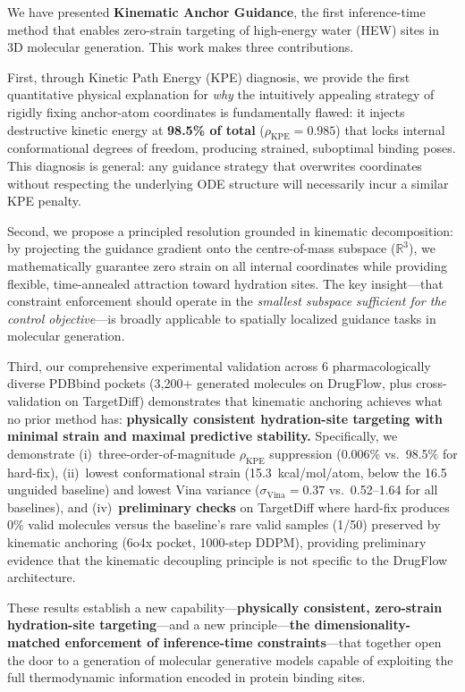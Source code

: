 \documentclass{article}
\newcommand{\KPERatio}{\ensuremath{\rho_{\text{KPE}}}}
\newcommand{\reals}{\ensuremath{\mathbb{R}}}
\begin{document}
We have presented \textbf{Kinematic Anchor Guidance}, the first inference-time
method that enables zero-strain targeting of high-energy water (HEW) sites
in 3D molecular generation.  This work makes three contributions.

First, through Kinetic Path Energy (KPE) diagnosis, we provide the first
quantitative physical explanation for \emph{why} the intuitively appealing
strategy of rigidly fixing anchor-atom coordinates is fundamentally flawed:
it injects destructive kinetic energy at \textbf{98.5\% of total}
($\KPERatio = 0.985$) that locks internal conformational degrees of freedom,
producing strained, suboptimal binding poses.  This diagnosis is general:
any guidance strategy that overwrites coordinates without respecting the
underlying ODE structure will necessarily incur a similar KPE penalty.

Second, we propose a principled resolution grounded in kinematic
decomposition: by projecting the guidance gradient onto the centre-of-mass
subspace ($\reals^3$), we mathematically guarantee zero strain on all
internal coordinates while providing flexible, time-annealed attraction
toward hydration sites.  The key insight---that constraint enforcement
should operate in the \emph{smallest subspace sufficient for the control
objective}---is broadly applicable to spatially localized guidance tasks
in molecular generation.

Third, our comprehensive experimental validation across 6 pharmacologically
diverse PDBbind pockets (3,200+ generated molecules on DrugFlow, plus
cross-validation on TargetDiff) demonstrates that kinematic anchoring
achieves what no prior method has:
\textbf{physically consistent hydration-site targeting with minimal strain
and maximal predictive stability.}  Specifically, we demonstrate
(i)~three-order-of-magnitude $\KPERatio$ suppression (0.006\% vs.\ 98.5\%
for hard-fix), (ii)~lowest conformational strain (15.3~kcal/mol/atom,
below the 16.5 unguided baseline) and lowest Vina variance
($\sigma_{\text{Vina}}=0.37$ vs.\ 0.52--1.64 for all baselines), and
(iv)~\textbf{preliminary checks} on TargetDiff where hard-fix
produces 0\% valid molecules versus the baseline's rare valid samples
(1/50) preserved by kinematic anchoring (6o4x pocket, 1000-step DDPM),
providing preliminary evidence that the kinematic decoupling principle
is not specific to the DrugFlow architecture.

These results establish a new capability---\textbf{physically consistent,
zero-strain hydration-site targeting}---and a new principle---\textbf{the
dimensionality-matched enforcement of inference-time constraints}---that
together open the door to a generation of molecular generative models
capable of exploiting the full thermodynamic information encoded in
protein binding sites.
\end{document}
